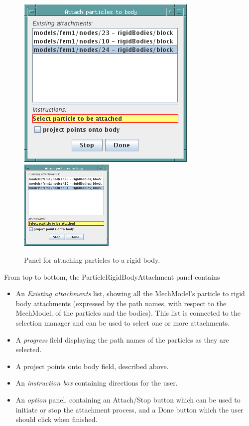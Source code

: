 \documentclass{article}
\begin{document}
\begin{figure}
\begin{center}
\iflatexml
\includegraphics[]{images/attachParticlesToRigidBodyPanel}
\else
\includegraphics[width=0.40\textwidth]{images/attachParticlesToRigidBodyPanel}
\fi
\end{center}
\caption{Panel for attaching particles to a rigid body.}%
\label{attachParticlesToRigidBodyPanelFig}
\end{figure}

From top to bottom, the ParticleRigidBodyAttachment panel contains

\begin{itemize}

\item An {\it Existing attachments} list, showing all the MechModel's particle
to rigid body attachments (expressed by the path names, with respect
to the MechModel, of the particles and the bodies). This list is
connected to the selection manager and can be used to select one or
more attachments.

\item A {\it progress} field displaying the path names of the particles as
they are selected.

\item A {\sf project points onto body} field, described above.

\item An {\it instruction box} containing directions for the user.

\item An {\it option} panel, containing an {\sf Attach/Stop} button which can be used
to initiate or stop the attachment process, and a {\sf Done} button which
the user should click when finished.

\end{itemize}
\end{document}
